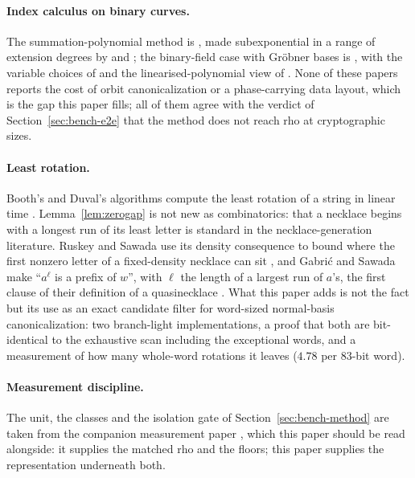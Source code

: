 \paragraph{Index calculus on binary curves.}
The summation-polynomial method is \citet{semaev2004}, made
subexponential in a range of extension degrees by \citet{gaudry2009}
and \citet{diem2011}; the binary-field case with Gr\"obner bases is
\citet{fppr2012,petitquisquater2012}, with the variable choices of
\citet{hpst2013,shantzteske2013} and the linearised-polynomial view of
\citet{huang2015}. None of these papers reports the cost of orbit
canonicalization or a phase-carrying data layout, which is the gap this
paper fills; all of them agree with the verdict of
Section~\ref{sec:bench-e2e} that the method does not reach rho at
cryptographic sizes.

\paragraph{Least rotation.}
Booth's and Duval's algorithms compute the least rotation of a string
in linear time \citep{booth1980,duval1983}. Lemma~\ref{lem:zerogap}
is not new as combinatorics: that a necklace begins with a longest run
of its least letter is standard in the necklace-generation literature.
Ruskey and Sawada use its density consequence to bound where the first
nonzero letter of a fixed-density necklace can sit
\citep[\S3.2]{ruskeysawada1999}, and Gabri\'c and Sawada make ``$a^\ell$
is a prefix of $w$'', with $\ell$ the length of a largest run of $a$'s,
the first clause of their definition of a quasinecklace
\citep[Definition~3]{gabricsawada2026}. What this paper adds is not the
fact but its use as an exact candidate filter for word-sized
normal-basis canonicalization: two branch-light implementations, a
proof that both are bit-identical to the exhaustive scan including the
exceptional words, and a measurement of how many whole-word rotations
it leaves ($4.78$ per $83$-bit word).

\paragraph{Measurement discipline.}
The unit, the classes and the isolation gate of
Section~\ref{sec:bench-method} are taken from the companion
measurement paper \citep{ecdlpconstant}, which this paper should be
read alongside: it supplies the matched rho and the floors; this paper
supplies the representation underneath both.
